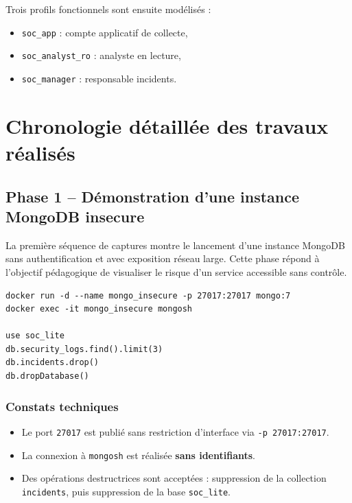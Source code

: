 \documentclass[11pt,a4paper]{article}
\begin{document}
Trois profils fonctionnels sont ensuite modélisés :
\begin{itemize}
  \item \texttt{soc\_app} : compte applicatif de collecte,
  \item \texttt{soc\_analyst\_ro} : analyste en lecture,
  \item \texttt{soc\_manager} : responsable incidents.
\end{itemize}

\section{Chronologie détaillée des travaux réalisés}

\subsection{Phase 1 -- Démonstration d'une instance MongoDB insecure}

La première séquence de captures montre le lancement d'une instance MongoDB sans authentification et avec exposition réseau large. Cette phase répond à l'objectif pédagogique de visualiser le risque d'un service accessible sans contrôle.

\begin{tcolorbox}[breakable,colback=CodeBg,colframe=CodeFrame,title=Extrait de commandes observées]
\begin{Verbatim}[fontsize=\small,breaklines,breakanywhere]
docker run -d --name mongo_insecure -p 27017:27017 mongo:7
docker exec -it mongo_insecure mongosh

use soc_lite
db.security_logs.find().limit(3)
db.incidents.drop()
db.dropDatabase()
\end{Verbatim}
\end{tcolorbox}

\subsubsection*{Constats techniques}
\begin{itemize}
  \item Le port \texttt{27017} est publié sans restriction d'interface via \texttt{-p 27017:27017}.
  \item La connexion à \texttt{mongosh} est réalisée \textbf{sans identifiants}.
  \item Des opérations destructrices sont acceptées : suppression de la collection \texttt{incidents}, puis suppression de la base \texttt{soc\_lite}.
\end{itemize}
\end{document}
